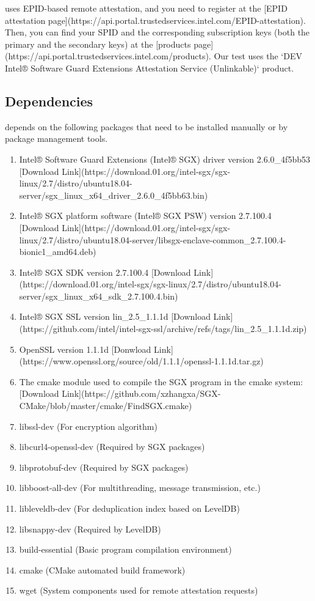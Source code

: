 \sysnameS uses EPID-based remote attestation, and you need to register at the [EPID attestation page](https://api.portal.trustedservices.intel.com/EPID-attestation). Then, you can find your SPID and the corresponding subscription keys (both the primary and the secondary keys) at the [products page](https://api.portal.trustedservices.intel.com/products). Our test uses the `DEV Intel® Software Guard Extensions Attestation Service (Unlinkable)` product.


\subsection{Dependencies}

\sysnameS depends on the following packages that  need to be installed manually or by package management tools.

\begin{enumerate}
    \item Intel® Software Guard Extensions (Intel® SGX) driver version 2.6.0\_4f5bb53 [Download Link](https://download.01.org/intel-sgx/sgx-linux/2.7/distro/ubuntu18.04-server/sgx\_linux\_x64\_driver\_2.6.0\_4f5bb63.bin)
    \item Intel® SGX platform software (Intel® SGX PSW) version 2.7.100.4 [Download Link](https://download.01.org/intel-sgx/sgx-linux/2.7/distro/ubuntu18.04-server/libsgx-enclave-common\_2.7.100.4-bionic1\_amd64.deb)
    \item Intel® SGX SDK version 2.7.100.4 [Download Link](https://download.01.org/intel-sgx/sgx-linux/2.7/distro/ubuntu18.04-server/sgx\_linux\_x64\_sdk\_2.7.100.4.bin)
    \item Intel® SGX SSL version lin\_2.5\_1.1.1d [Download Link](https://github.com/intel/intel-sgx-ssl/archive/refs/tags/lin\_2.5\_1.1.1d.zip)
    \item OpenSSL version 1.1.1d [Donwload Link](https://www.openssl.org/source/old/1.1.1/openssl-1.1.1d.tar.gz)
    \item The cmake module used to compile the SGX program in the cmake system: [Download Link](https://github.com/xzhangxa/SGX-CMake/blob/master/cmake/FindSGX.cmake)
    \item libssl-dev (For \sysnameS encryption algorithm)
    \item libcurl4-openssl-dev (Required by SGX packages)
    \item libprotobuf-dev (Required by SGX packages)
    \item libboost-all-dev (For \sysnameS multithreading, message transmission, etc.)
    \item libleveldb-dev (For \sysnameS deduplication index based on LevelDB)
    \item libsnappy-dev (Required by LevelDB)
    \item build-essential (Basic program compilation environment)
    \item cmake (CMake automated build framework)
    \item wget (System components used for remote attestation requests)
    
\end{enumerate}

